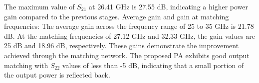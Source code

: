 The maximum value of $S_{21}$ at 26.41 GHz is 27.55 dB, indicating a
higher power gain compared to the previous stages. Average gain and
gain at matching frequencies: The average gain across the frequency range
of 25 to 35 GHz is 21.78 dB. At the matching frequencies of 27.12 GHz and
32.33 GHz, the gain values are 25 dB and 18.96 dB, respectively. These
gains demonstrate the improvement achieved through the matching network. The proposed PA exhibits good output matching
with $S_{22}$ values of less than -5 dB, indicating that a small portion of the
output power is reflected back.
